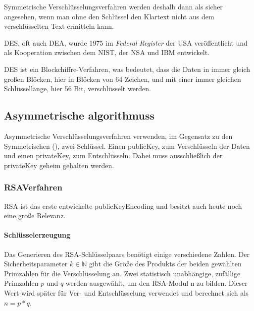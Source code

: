 Symmetrische Verschlüsselungsverfahren werden deshalb dann als sicher angesehen, wenn man ohne den Schlüssel den Klartext nicht aus dem verschlüsselten Text ermitteln kann.\autocite[\pagef~5]{kryptographische-algorithmen}

\ac{DES}, oft auch \ac{DEA}, wurde 1975 im \textit{Federal Register} der USA veröffentlicht und als Kooperation zwischen dem \ac{NIST}, der \ac{NSA} und \ac{IBM} entwickelt.\autocite[\pagef~232]{nsa-meyer}

\ac{DES} ist ein Blockchiffre-Verfahren, was bedeutet, dass die Daten in immer gleich großen Blöcken, hier in Blöcken von 64 Zeichen, und mit einer immer gleichen Schlüssellänge, hier 56 Bit, verschlüsselt werden.\autocite[\pagef~6]{kryptographische-algorithmen}


\subsection[Asymmetrische Algorithmen]{Asymmetrische \glspl{algorithmus}}\label{subsec:asymmetrische-algorithmen}
Asymmetrische Verschlüsselungsverfahren verwenden, im Gegensatz zu den Symmetrischen (\solol), zwei Schlüssel.
Einen \gls{publicKey}, zum Verschlüsseln der Daten und einen \gls{privateKey}, zum Entschlüsseln.
Dabei muss ausschließlich der \gls{privateKey} geheim gehalten werden.


\subsubsection[RSA-Verfahren]{\acs{RSA}\nonbreakdash Verfahren}\label{subsubsec:rsa-verfahren}

\ac{RSA} ist das erste entwickelte \gls{publicKeyEncoding} und besitzt auch heute noch eine große Relevanz.\autocite[\pagef~168]{buchmann-einfuhrung-2016}

\paragraph[Schlüsselerzeugung]{Schlüsselerzeugung}\label{par:schluesselerzeugung}
Das Generieren des \ac{RSA}-Schlüsselpaars benötigt einige verschiedene Zahlen.
Der Sicherheitsparameter $k \in \mathbb{N}$ gibt die Größe des Produkts der beiden gewählten Primzahlen für die Verschlüsselung an.
Zwei statistisch unabhängige, zufällige Primzahlen $p$ und $q$ werden ausgewählt, um den \ac{RSA}-Modul n zu bilden.
Dieser Wert wird später für Ver- und Entschlüsselung verwendet und berechnet sich als $n = p*q$.

